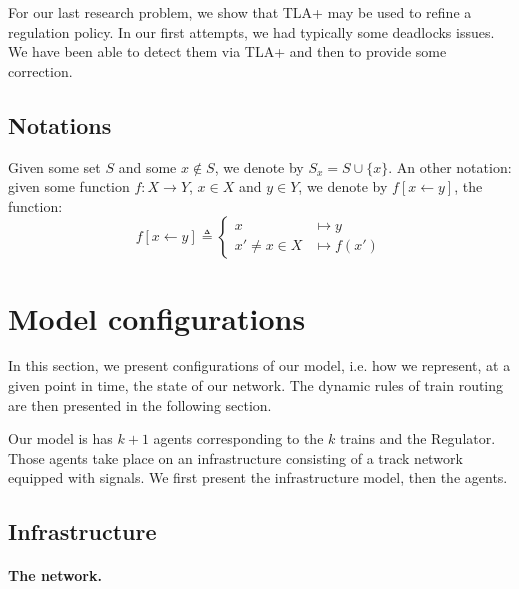 \documentclass[runningheads]{llncs}
\begin{document}
For our last research problem, we show that TLA+ may be used to refine a regulation policy. In our first attempts, we had typically some deadlocks issues. We have been able to detect them via TLA+ and then to provide some correction. 




\subsection{Notations}

Given some set $S$ and some $x \not\in S$, we denote by $S_x = S \cup \{ x\}$.  An other notation: given some function $f: X \to Y$, $x \in X$ and $y \in Y$, we denote by $f[x \leftarrow y]$, the function:
 $$f[x \leftarrow y] \triangleq \left\{  \begin{array}{ll} x &\mapsto y\\
x' \neq x \in X &\mapsto f(x')
\end{array}\right.$$


\section{Model configurations}
\label{sec:informal-model}

In this section, we present configurations of our model, i.e. how we represent, at a given point in time, the state of our network. The dynamic rules of train routing are then presented in the following section.

Our model is has $k+1$ agents corresponding to the $k$ trains and the Regulator. Those agents take place on an infrastructure consisting of a track network equipped with signals. We first present the infrastructure model, then the agents.

\subsection{Infrastructure}

\paragraph{The network.} 
\end{document}
